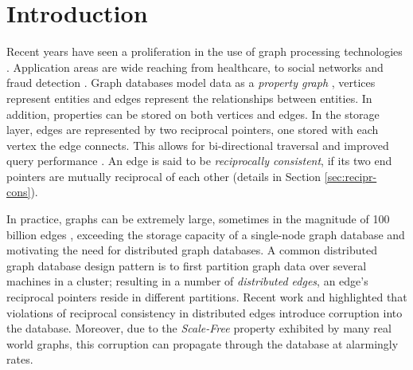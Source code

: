 \documentclass[sigplan,10pt]{acmart}
\begin{document}


\maketitle

\section{Introduction}
\label{sec:introduction}

Recent years have seen a proliferation in the use of graph processing technologies \cite{Besta2019}. Application areas are wide reaching from healthcare, to social networks and fraud detection \cite{Eifrem2016}. Graph databases model data as a \textit{property graph} \cite{Robinson2015}, vertices represent entities and edges represent the relationships between entities. In addition, properties can be stored on both vertices and edges. In the storage layer, edges are represented by two reciprocal pointers, one stored with each vertex the edge connects. This allows for bi-directional traversal and improved query performance \cite{Robinson2015}. An edge is said to be \emph{reciprocally consistent}, if its two end pointers are mutually reciprocal of each other (details in Section \ref{sec:recipr-cons}).

In practice, graphs can be extremely large, sometimes in the magnitude of 100 billion edges \cite{Sahu2017}, exceeding the storage capacity of a single-node graph database and motivating the need for distributed graph databases. A common distributed graph database design pattern is to first partition graph data over several machines in a cluster; resulting in a number of \emph{distributed edges}, an edge's reciprocal pointers reside in different partitions. Recent work \cite{Ezhilchelvan2018} and \cite{Webber2019} highlighted that violations of reciprocal consistency in distributed edges introduce corruption into the database. Moreover, due to the \emph{Scale-Free} \cite{ScaleFree} property exhibited by many real world graphs, this corruption can propagate through the database at alarmingly rates.
\end{document}

